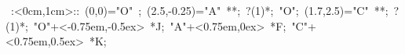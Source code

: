 
\hbox{
\xy    <1cm,0cm>:<0cm,1cm>::
       (0,0)="O" ; (2.5,-0.25)="A" **\dir{-};  ?(1)*\dir{>};
       "O"; (1.7,2.5)="C" **\dir{-};  ?(1)*\dir{>};
       "O"+<-0.75em,-0.5ex> *{J};
       "A"+<0.75em,0ex> *{F};
       "C"+<0.75em,0.5ex> *{K};
       \endxy}
	   
